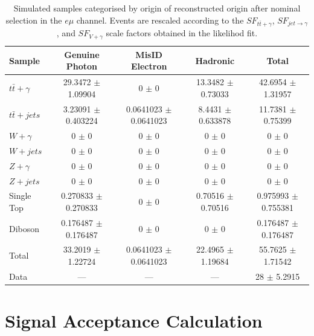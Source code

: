\begin{table}
\begin{center}
\resizebox{\columnwidth}{!} {
\begin{tabular}{l|ccc|c}
\hline
	\textbf{Sample} & \textbf{Genuine Photon} & \textbf{MisID Electron} & \textbf{Hadronic} & \textbf{Total} \\
\hline
$t\bar{t}+\gamma$  & 29.3472 $\pm$ 1.09904 & 0 $\pm$ 0 & 13.3482 $\pm$ 0.73033 & 42.6954 $\pm$ 1.31957 \\
$t\bar{t}+jets$  & 3.23091 $\pm$ 0.403224 & 0.0641023 $\pm$ 0.0641023 & 8.4431 $\pm$ 0.633878 & 11.7381 $\pm$ 0.75399 \\
$W+\gamma$  & 0 $\pm$ 0 & 0 $\pm$ 0 & 0 $\pm$ 0 & 0 $\pm$ 0 \\
$W+jets$  & 0 $\pm$ 0 & 0 $\pm$ 0 & 0 $\pm$ 0 & 0 $\pm$ 0 \\
$Z+\gamma$  & 0 $\pm$ 0 & 0 $\pm$ 0 & 0 $\pm$ 0 & 0 $\pm$ 0 \\
$Z+jets$  & 0 $\pm$ 0 & 0 $\pm$ 0 & 0 $\pm$ 0 & 0 $\pm$ 0 \\
Single Top  & 0.270833 $\pm$ 0.270833 & 0 $\pm$ 0 & 0.70516 $\pm$ 0.70516 & 0.975993 $\pm$ 0.755381 \\
Diboson  & 0.176487 $\pm$ 0.176487 & 0 $\pm$ 0 & 0 $\pm$ 0 & 0.176487 $\pm$ 0.176487 \\
\hline
Total  & 33.2019 $\pm$ 1.22724 & 0.0641023 $\pm$ 0.0641023 & 22.4965 $\pm$ 1.19684 & 55.7625 $\pm$ 1.71542 \\
Data  & --- & --- & --- & 28 $\pm$ 5.2915 \\
\hline	
\end{tabular}
}
\end{center}
\caption{Simulated samples categorised by origin of reconstructed origin after nominal selection in the $e\mu$ channel. Events are rescaled according to the $SF_{t\bar{t}+\gamma}$, $SF_{jet\to\gamma}$, and $SF_{V+\gamma}$ scale factors obtained in the likelihod fit.}
\label{tab-SigPhotonsEMuScaled}
\end{table}	


\section{Signal Acceptance Calculation} \label{subsec-SignalAcceptanceCalculation}



